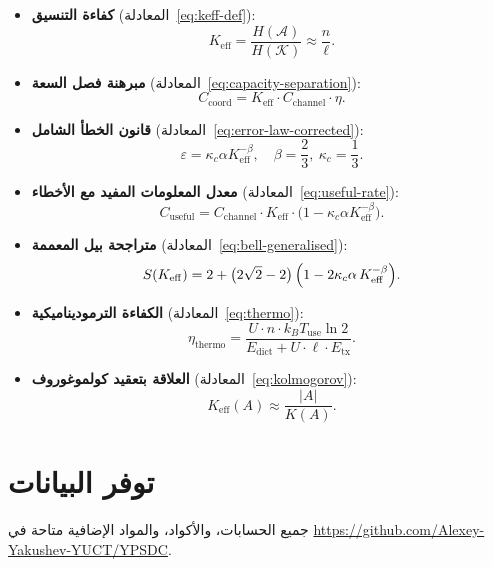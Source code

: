 \documentclass[12pt,a4paper]{article}
\newcommand{\Keff}{K_{\mathrm{eff}}}
\theoremstyle{remark}
\begin{document}
	\begin{itemize}
		\item \textbf{كفاءة التنسيق} (المعادلة~\eqref{eq:keff-def}):
		\[
		\Keff = \frac{H(\mathcal{A})}{H(\mathcal{K})} \approx \frac{n}{\ell}.
		\]
		
		\item \textbf{مبرهنة فصل السعة} (المعادلة~\eqref{eq:capacity-separation}):
		\[
		C_{\text{coord}} = \Keff \cdot C_{\text{channel}} \cdot \eta.
		\]
		
		\item \textbf{قانون الخطأ الشامل} (المعادلة~\eqref{eq:error-law-corrected}):
		\[
		\varepsilon = \kappa_c \alpha K_{\mathrm{eff}}^{-\beta}, \quad \beta = \frac{2}{3},\ \kappa_c = \frac{1}{3}.
		\]
		
		\item \textbf{معدل المعلومات المفيد مع الأخطاء} (المعادلة~\eqref{eq:useful-rate}):
		\[
		C_{\text{useful}} = C_{\text{channel}} \cdot \Keff \cdot \bigl(1 - \kappa_c \alpha K_{\mathrm{eff}}^{-\beta}\bigr).
		\]
		
		\item \textbf{متراجحة بيل المعممة} (المعادلة~\eqref{eq:bell-generalised}):
		\[
		S(K_{\mathrm{eff}}) = 2 + \bigl(2\sqrt{2}-2\bigr)\,\Bigl(1 - 2\kappa_c\alpha\,K_{\mathrm{eff}}^{-\beta}\Bigr).
		\]
		
		\item \textbf{الكفاءة الترموديناميكية} (المعادلة~\eqref{eq:thermo}):
		\[
		\eta_{\text{thermo}} = \frac{U \cdot n \cdot k_B T_{\text{use}} \ln 2}{E_{\text{dict}} + U \cdot \ell \cdot E_{\text{tx}}}.
		\]
		
		\item \textbf{العلاقة بتعقيد كولموغوروف} (المعادلة~\eqref{eq:kolmogorov}):
		\[
		\Keff(A) \approx \frac{|A|}{K(A)}.
		\]
	\end{itemize}
	
	\section*{توفر البيانات}
	
	جميع الحسابات، والأكواد، والمواد الإضافية متاحة في \url{https://github.com/Alexey-Yakushev-YUCT/YPSDC}.
	
\end{document}
